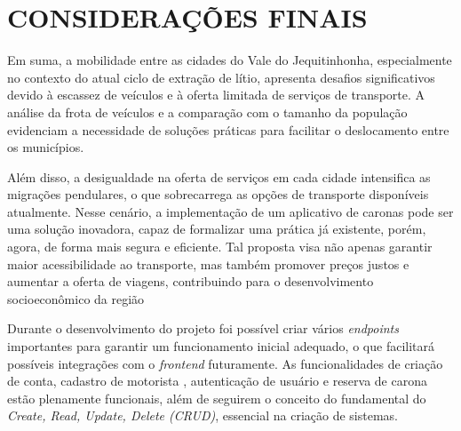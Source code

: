 \chapter{CONSIDERAÇÕES FINAIS}

Em suma, a mobilidade entre as cidades do Vale do Jequitinhonha, especialmente no contexto do atual ciclo de extração de lítio, apresenta desafios significativos devido à escassez de veículos e à oferta limitada de serviços de transporte. A análise da frota de veículos e a comparação com o tamanho da população evidenciam a necessidade de soluções práticas para facilitar o deslocamento entre os municípios.

Além disso, a desigualdade na oferta de serviços em cada cidade intensifica as migrações pendulares, o que sobrecarrega as opções de transporte disponíveis atualmente. Nesse cenário, a implementação de um aplicativo de caronas pode ser uma solução inovadora, capaz de formalizar uma prática já existente, porém, agora, de forma mais segura e eficiente. Tal proposta visa não apenas garantir maior acessibilidade ao transporte, mas também promover preços justos e aumentar a oferta de viagens, contribuindo para o desenvolvimento socioeconômico da região

Durante o desenvolvimento do projeto foi possível criar vários \textit{endpoints} importantes para garantir um funcionamento inicial adequado, o que facilitará possíveis integrações com o \textit{frontend} futuramente. As funcionalidades de criação de conta, cadastro de motorista , autenticação de usuário e reserva de carona estão plenamente funcionais, além de seguirem o conceito do fundamental do \textit{Create, Read, Update, Delete (CRUD)}, essencial na criação de sistemas. 
